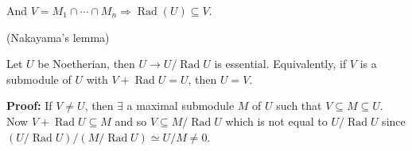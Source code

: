 \documentclass[11pt, a4paper]{report}
\begin{document}
And $V = M_{1} \cap \cdots \cap M_{n} \Rightarrow \operatorname{Rad}(U) \subseteq V$.


\begin{theorem}
(Nakayama's lemma)

Let $U$ be Noetherian, then $U \rightarrow U / \operatorname{Rad} U$ is essential. Equivalently, if $V$ is a submodule of $U$ with $V + \operatorname{Rad} U = U$, then $U = V$.

\textbf{Proof:}
If $V \neq U$, then $\exists$ a maximal submodule $M$ of $U$ such that $V \subseteq M \subseteq U$. Now $V + \operatorname{Rad} U \subseteq M$ and so $V \subseteq M/\operatorname{Rad} U$ which is not equal to $U/\operatorname{Rad} U$ since $(U/\operatorname{Rad} U)/(M/\operatorname{Rad} U) \simeq U/M \neq 0$.
\end{theorem}
\end{document}
